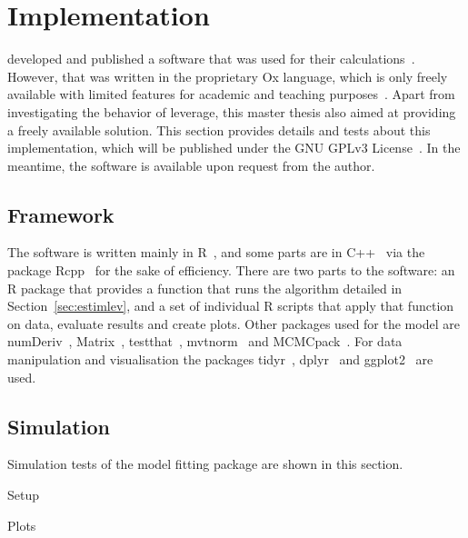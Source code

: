\section{Implementation}

\citeauthor{Nakajima2009} developed and published a software that was used for their calculations~\citep{nakajima2009code}.
However, that was written in the proprietary Ox language, which is only freely available with limited features for academic and teaching purposes~\citep{doornik2009object}.
Apart from investigating the behavior of leverage, this master thesis also aimed at providing a freely available solution.
This section provides details and tests about this implementation, which will be published under the GNU GPLv3 License~\citep{gplv3}.
In the meantime, the software is available upon request from the author.

\subsection{Framework}

The software is written mainly in R~\citep{rlanguage}, and some parts are in C++~\citep{iso2016iec} via the package Rcpp~\citep{rcpp2011} for the sake of efficiency.
There are two parts to the software: an R package that provides a function that runs the algorithm detailed in Section~\ref{sec:estimlev}, and a set of individual R scripts that apply that function on data, evaluate results and create plots.
Other packages used for the model are numDeriv~\citep{rnumderiv}, Matrix~\citep{rmatrix}, testthat~\citep{rtestthat}, mvtnorm~\citep{rmvtnorm} and MCMCpack~\citep{rmcmcpack}.
For data manipulation and visualisation the packages tidyr~\citep{rtidyr}, dplyr~\citep{rdplyr} and ggplot2~\citep{rggplot2} are used.

\subsection{Simulation}

Simulation tests of the model fitting package are shown in this section.

Setup

Plots
